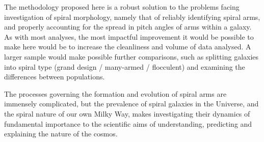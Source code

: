 The methodology proposed here is a robust solution to the problems facing investigation of spiral morphology, namely that of reliably identifying spiral arms, and properly accounting for the spread in pitch angles of arms within a galaxy. As with most analyses, the most impactful improvement it would be possible to make here would be to increase the cleanliness and volume of data analysed. A larger sample would make possible further comparisons, such as splitting galaxies into spiral type (grand design / many-armed / flocculent) and examining the differences between populations.

The processes governing the formation and evolution of spiral arms are immensely complicated, but the prevalence of spiral galaxies in the Universe, and the spiral nature of our own Milky Way, makes investigating their dynamics of fundamental importance to the scientific aims of understanding, predicting and explaining the nature of the cosmos.
